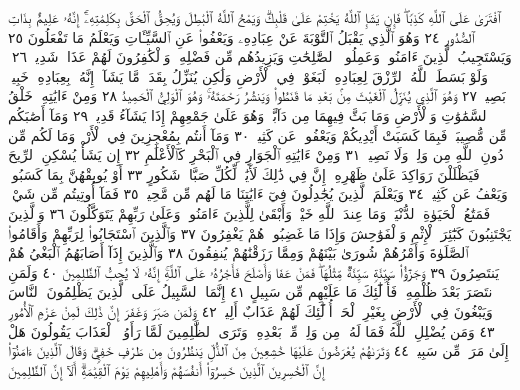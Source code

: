 ٱفْتَرَىٰ عَلَى ٱللَّهِ كَذِبࣰاۖ فَإِن يَشَإِ ٱللَّهُ يَخْتِمْ عَلَىٰ قَلْبِكَۗ وَيَمْحُ ٱللَّهُ
ٱلْبَٰطِلَ وَيُحِقُّ ٱلْحَقَّ بِكَلِمَٰتِهِۦٓۚ إِنَّهُۥ عَلِيمُۢ بِذَاتِ ٱلصُّدُورِ ٢٤
وَهُوَ ٱلَّذِي يَقْبَلُ ٱلتَّوْبَةَ عَنْ عِبَادِهِۦ وَيَعْفُوا۟ عَنِ ٱلسَّيِّـَٔاتِ
وَيَعْلَمُ مَا تَفْعَلُونَ ٢٥ وَيَسْتَجِيبُ ٱلَّذِينَ ءَامَنُوا۟ وَعَمِلُوا۟
ٱلصَّٰلِحَٰتِ وَيَزِيدُهُم مِّن فَضْلِهِۦۚ وَٱلْكَٰفِرُونَ لَهُمْ عَذَابࣱ
شَدِيدࣱ ٢٦۞ وَلَوْ بَسَطَ ٱللَّهُ ٱلرِّزْقَ لِعِبَادِهِۦ لَبَغَوْا۟ فِي ٱلْأَرْضِ
وَلَٰكِن يُنَزِّلُ بِقَدَرࣲ مَّا يَشَآءُۚ إِنَّهُۥ بِعِبَادِهِۦ خَبِيرُۢ بَصِيرࣱ ٢٧ وَهُوَ ٱلَّذِي
يُنَزِّلُ ٱلْغَيْثَ مِنۢ بَعْدِ مَا قَنَطُوا۟ وَيَنشُرُ رَحْمَتَهُۥۚ وَهُوَ ٱلْوَلِيُّ ٱلْحَمِيدُ ٢٨
وَمِنْ ءَايَٰتِهِۦ خَلْقُ ٱلسَّمَٰوَٰتِ وَٱلْأَرْضِ وَمَا بَثَّ فِيهِمَا مِن دَآبَّةࣲۚ
وَهُوَ عَلَىٰ جَمْعِهِمْ إِذَا يَشَآءُ قَدِيرࣱ ٢٩ وَمَآ أَصَٰبَكُم مِّن مُّصِيبَةࣲ فَبِمَا
كَسَبَتْ أَيْدِيكُمْ وَيَعْفُوا۟ عَن كَثِيرࣲ ٣٠ وَمَآ أَنتُم بِمُعْجِزِينَ
فِي ٱلْأَرْضِۖ وَمَا لَكُم مِّن دُونِ ٱللَّهِ مِن وَلِيࣲّ وَلَا نَصِيرࣲ ٣١
وَمِنْ ءَايَٰتِهِ ٱلْجَوَارِ فِي ٱلْبَحْرِ كَٱلْأَعْلَٰمِ ٣٢ إِن يَشَأْ يُسْكِنِ ٱلرِّيحَ
فَيَظْلَلْنَ رَوَاكِدَ عَلَىٰ ظَهْرِهِۦٓۚ إِنَّ فِي ذَٰلِكَ لَأٓيَٰتࣲ لِّكُلِّ صَبَّارࣲ شَكُورٍ ٣٣
أَوْ يُوبِقْهُنَّ بِمَا كَسَبُوا۟ وَيَعْفُ عَن كَثِيرࣲ ٣٤ وَيَعْلَمَ ٱلَّذِينَ
يُجَٰدِلُونَ فِيٓ ءَايَٰتِنَا مَا لَهُم مِّن مَّحِيصࣲ ٣٥ فَمَآ أُوتِيتُم مِّن شَيْءࣲ فَمَتَٰعُ
ٱلْحَيَوٰةِ ٱلدُّنْيَاۚ وَمَا عِندَ ٱللَّهِ خَيْرࣱ وَأَبْقَىٰ لِلَّذِينَ ءَامَنُوا۟ وَعَلَىٰ رَبِّهِمْ
يَتَوَكَّلُونَ ٣٦ وَٱلَّذِينَ يَجْتَنِبُونَ كَبَٰٓئِرَ ٱلْإِثْمِ وَٱلْفَوَٰحِشَ وَإِذَا مَا
غَضِبُوا۟ هُمْ يَغْفِرُونَ ٣٧ وَٱلَّذِينَ ٱسْتَجَابُوا۟ لِرَبِّهِمْ وَأَقَامُوا۟ ٱلصَّلَوٰةَ
وَأَمْرُهُمْ شُورَىٰ بَيْنَهُمْ وَمِمَّا رَزَقْنَٰهُمْ يُنفِقُونَ ٣٨ وَٱلَّذِينَ إِذَآ أَصَابَهُمُ
ٱلْبَغْيُ هُمْ يَنتَصِرُونَ ٣٩ وَجَزَٰٓؤُا۟ سَيِّئَةࣲ سَيِّئَةࣱ مِّثْلُهَاۖ فَمَنْ عَفَا
وَأَصْلَحَ فَأَجْرُهُۥ عَلَى ٱللَّهِۚ إِنَّهُۥ لَا يُحِبُّ ٱلظَّٰلِمِينَ ٤٠ وَلَمَنِ ٱنتَصَرَ
بَعْدَ ظُلْمِهِۦ فَأُو۟لَٰٓئِكَ مَا عَلَيْهِم مِّن سَبِيلٍ ٤١ إِنَّمَا ٱلسَّبِيلُ عَلَى
ٱلَّذِينَ يَظْلِمُونَ ٱلنَّاسَ وَيَبْغُونَ فِي ٱلْأَرْضِ بِغَيْرِ ٱلْحَقِّۚ أُو۟لَٰٓئِكَ
لَهُمْ عَذَابٌ أَلِيمࣱ ٤٢ وَلَمَن صَبَرَ وَغَفَرَ إِنَّ ذَٰلِكَ لَمِنْ عَزْمِ
ٱلْأُمُورِ ٤٣ وَمَن يُضْلِلِ ٱللَّهُ فَمَا لَهُۥ مِن وَلِيࣲّ مِّنۢ بَعْدِهِۦۗ وَتَرَى
ٱلظَّٰلِمِينَ لَمَّا رَأَوُا۟ ٱلْعَذَابَ يَقُولُونَ هَلْ إِلَىٰ مَرَدࣲّ مِّن سَبِيلࣲ ٤٤
وَتَرَىٰهُمْ يُعْرَضُونَ عَلَيْهَا خَٰشِعِينَ مِنَ ٱلذُّلِّ يَنظُرُونَ
مِن طَرْفٍ خَفِيࣲّۗ وَقَالَ ٱلَّذِينَ ءَامَنُوٓا۟ إِنَّ ٱلْخَٰسِرِينَ ٱلَّذِينَ
خَسِرُوٓا۟ أَنفُسَهُمْ وَأَهْلِيهِمْ يَوْمَ ٱلْقِيَٰمَةِۗ أَلَآ إِنَّ ٱلظَّٰلِمِينَ
